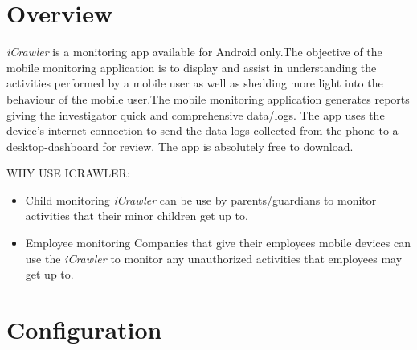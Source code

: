 \documentclass[hidelinks, 12pt, oneside]{article}
\begin{document}
	
	\tableofcontents
	\newpage
	
	\section{Overview}
	\emph{iCrawler} is a monitoring app available for Android only.The objective of the mobile monitoring application is to display and assist in understanding the activities performed by a mobile user as well as shedding more light into the behaviour of the mobile user.The mobile monitoring application generates reports giving the investigator quick and comprehensive data/logs. The app
uses the device's internet connection to send the data logs collected from the phone to a desktop-dashboard for review. The app is absolutely free to download.\newline\newline
	 
	 \uppercase{Why use \MakeLowercase iCrawler:}\newline
	 \begin{itemize}
		\item Child monitoring\newline
		\emph{iCrawler} can be use by parents/guardians to monitor activities that their minor
		 children get up to.	
		\item Employee monitoring\newline
		Companies that give their employees mobile devices can use the \emph{iCrawler} to monitor any 
		unauthorized activities that employees may get up to.
	\end{itemize}
	\newpage
	
	
	\section{Configuration}
	
\end{document}
